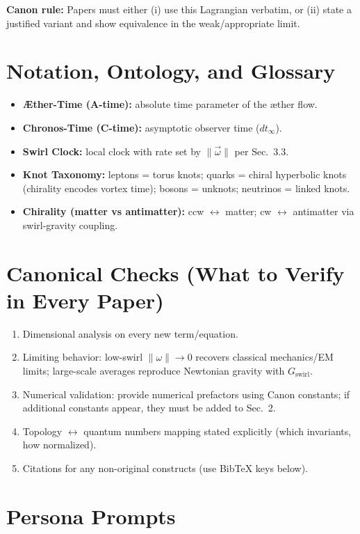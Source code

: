 \documentclass[11pt, a4paper]{article}
\begin{document}
\textbf{Canon rule:} Papers must either (i) use this Lagrangian verbatim, or (ii) state a justified variant and show equivalence in the weak/appropriate limit.

\section{Notation, Ontology, and Glossary}

\begin{itemize}
    \item \textbf{Æther-Time (A-time):} absolute time parameter of the æther flow.
    \item \textbf{Chronos-Time (C-time):} asymptotic observer time ($dt_{\infty}$).
    \item \textbf{Swirl Clock:} local clock with rate set by $\lVert\vec\omega\rVert$ per Sec.~3.3.
    \item \textbf{Knot Taxonomy:} leptons = torus knots; quarks = chiral hyperbolic knots (chirality encodes vortex time); bosons = unknots; neutrinos = linked knots.
    \item \textbf{Chirality (matter vs antimatter):} ccw $\leftrightarrow$ matter; cw $\leftrightarrow$ antimatter via swirl-gravity coupling.
\end{itemize}

\section{Canonical Checks (What to Verify in Every Paper)}

\begin{enumerate}
    \item Dimensional analysis on every new term/equation.
    \item Limiting behavior: low-swirl $\lVert\omega\rVert\to 0$ recovers classical mechanics/EM limits; large-scale averages reproduce Newtonian gravity with $G_{\text{swirl}}$.
    \item Numerical validation: provide numerical prefactors using Canon constants; if additional constants appear, they must be added to Sec.~2.
    \item Topology $\leftrightarrow$ quantum numbers mapping stated explicitly (which invariants, how normalized).
    \item Citations for any non-original constructs (use BibTeX keys below).
\end{enumerate}

\section{Persona Prompts}
\end{document}
